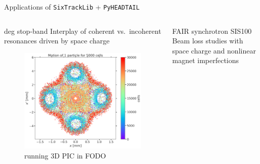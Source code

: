 \documentclass{beamer}
\begin{document}
{
\begin{frame}{Applications of  \texttt{SixTrackLib} +  \texttt{PyHEADTAIL}}
    \begin{columns}
        \begin{column}[T]{0.48\linewidth}
            \begin{block}{ deg stop-band}
                Interplay of coherent vs.\ incoherent resonances driven by space charge
                \begin{figure}
                    \centering
                    \includegraphics[width=\linewidth]{adrian_figs/k0xy93p5_k0z1to3_particlemotion_interm.png}
                    \caption{running 3D PIC in FODO}
                \end{figure}
            \end{block}
        \end{column} \hfill
        \begin{column}[T]{0.48\linewidth}
            \begin{block}{\centering FAIR synchrotron SIS100}
                Beam loss studies with space charge and nonlinear magnet imperfections
                \begin{figure}
                    \centering

\end{figure}
\end{block}
\end{column}
\end{columns}
\end{frame}}
\end{document}
